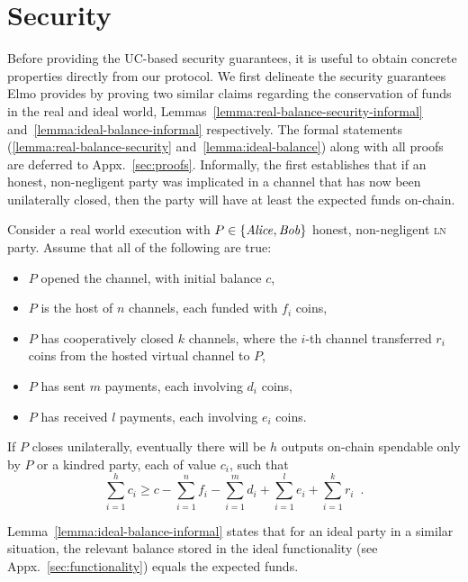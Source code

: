 \section{Security}
  \label{section:security}
    Before providing the UC-based security guarantees, it is useful to obtain
  concrete properties directly from our protocol. We first delineate the
  security guarantees Elmo provides by proving two similar claims regarding the
  conservation of funds in the real and ideal world,
  Lemmas~\ref{lemma:real-balance-security-informal}
  and~\ref{lemma:ideal-balance-informal} respectively. The formal statements
  (\ref{lemma:real-balance-security} and~\ref{lemma:ideal-balance}) along with
  all proofs are deferred
  to Appx.~\ref{sec:proofs}. Informally, the first
  establishes that if an honest, non-negligent party was implicated in a channel
  that has now been unilaterally closed,
  then the party will have at least the expected funds on-chain.

\begin{lemma}
\label{lemma:real-balance-security-informal}
  Consider a real world execution with $P \in \{\mathit{Alice}, \mathit{Bob}\}$ honest,
  non-negligent \textsc{ln} party. Assume that all of the following are true:
  \begin{itemize}
    \item $P$ opened the channel, with initial balance $c$,
    \item $P$ is the host of $n$ channels, each funded with $f_i$ coins,
    \item $P$ has cooperatively closed $k$ channels, where the $i$-th channel
    transferred $r_i$ coins from the hosted virtual channel to $P$,
    \item $P$ has sent $m$ payments, each involving $d_i$ coins,
    \item $P$ has received $l$ payments, each involving $e_i$ coins.
  \end{itemize}
  If $P$ closes unilaterally, eventually there will be $h$ outputs on-chain
  spendable only by $P$ or a kindred party, each of value $c_i$, such that
  \begin{equation}
    \sum\limits_{i=1}^h c_i \geq c - \sum\limits_{i=1}^n f_i -
    \sum\limits_{i=1}^m d_i + \sum\limits_{i=1}^l e_i + \sum\limits_{i=1}^k r_i
    \enspace.
  \end{equation}
\end{lemma}

  Lemma~\ref{lemma:ideal-balance-informal} states that for an ideal party in a
  similar situation, the relevant balance stored in the ideal functionality
  \fchan (see Appx.~\ref{sec:functionality}) equals
  the expected funds.

